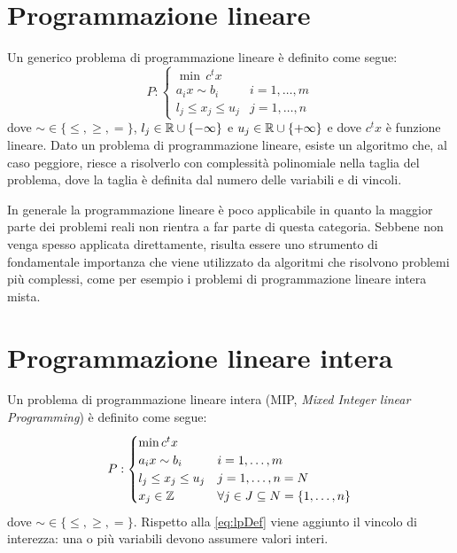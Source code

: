 \section{Programmazione lineare}%
\label{sec:Programmazione lineare}
Un generico problema di programmazione lineare è definito come segue:
\begin{equation} \label{eq:lpDef}
    P:
    \begin{cases}
        \min\,c^tx\\
        a_ix \sim b_i & i=1,\ldots,m\\
        l_j \leq x_j \leq u_j & j = 1, \ldots, n
    \end{cases}
\end{equation}
dove $\sim \in \{\leq, \geq, =\}$, $l_j \in \mathbb{R} \cup \{-\infty\}$ e $u_j \in \mathbb{R} \cup 
\{+\infty\}$ e dove $c^tx$ è funzione lineare.
Dato un problema di programmazione lineare, esiste un algoritmo che, al caso peggiore,
riesce a risolverlo con complessità polinomiale nella taglia del problema,
dove la taglia è definita dal numero delle variabili e di vincoli.

In generale la programmazione lineare è poco applicabile in quanto la maggior
parte dei problemi reali non rientra a far parte di questa categoria.
Sebbene non venga spesso applicata direttamente, risulta essere uno strumento
di fondamentale importanza che viene utilizzato da algoritmi che risolvono
problemi più complessi, come per esempio i problemi di programmazione lineare
intera mista.


\section{Programmazione lineare intera}%
\label{sec:MIP intro}
Un problema di programmazione lineare intera (MIP, \emph{Mixed Integer linear 
Programming}) è definito come segue:
\begin{equation}
    P:
    \begin{cases}
        \text{min}\,c^tx\\
        a_ix \sim b_i & i=1,\ldots,m\\
        l_j \leq x_j \leq u_j & j = 1, \ldots, n = N\\
        x_j \in \mathbb{Z} & \forall j \in J\subseteq N = \{1,\ldots, n\}
    \end{cases}
\end{equation}
dove $\sim \in \{\leq, \geq, =\}$.
Rispetto alla \ref{eq:lpDef} viene aggiunto il vincolo di interezza:
una o più variabili devono assumere valori interi.

